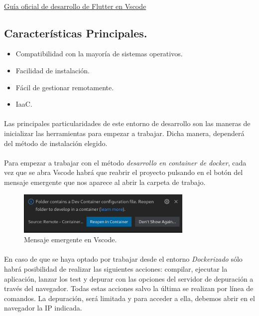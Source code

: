 \paragraph{}\href{https://esflutter.dev/docs/development/tools/vs-code}
{Guía oficial de desarrollo de Flutter en Vscode}

\subsection{Características Principales.}

\begin{itemize}
    \item Compatibilidad con la mayoría de sistemas operativos.
    \item Facilidad de instalación.
    \item Fácil de gestionar remotamente.
    \item \gls{IaaC}.
\end{itemize}

\paragraph{}Las principales particularidades de este entorno de desarrollo son las
maneras de inicializar las herramientas para empezar a trabajar. Dicha manera, dependerá
del método de instalación elegido.

\paragraph{}Para empezar a trabajar con el método \emph{desarrollo en container de docker},
cada vez que se abra Vscode habrá que reabrir el proyecto pulsando en el botón del mensaje
emergente que nos aparece al abrir la carpeta de trabajo.

\begin{figure}[H]
    \centering
    \includegraphics[width=0.75\textwidth]{imgs/dev-container}
    \caption[Mensaje emergente en Vscode]{Mensaje emergente en Vscode.}
    \label{imgs:vscode-devcontainer-2}
\end{figure}

\paragraph{}En caso de que se haya optado por trabajar desde el entorno \emph{Dockerizado}
sólo habrá posibilidad de realizar las siguientes acciones: compilar, ejecutar la aplicación,
lanzar los test y depurar con las opciones del servidor de depuración a través del navegador.
Todas estas acciones salvo la última se realizan por línea de comandos. La depuración,
será limitada y para acceder a ella, debemos abrir en el navegador la IP indicada.

